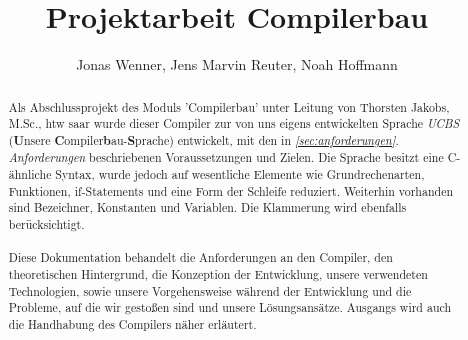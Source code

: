 \documentclass[12pt, a4paper, oneside, ngerman]{article}
\title{Projektarbeit Compilerbau}
\begin{document}
\author{Jonas Wenner, Jens Marvin Reuter, Noah Hoffmann}

\maketitle
\thispagestyle{empty}
\pagebreak
\tableofcontents
\newpage


\begin{abstract}

\noindent
Als Abschlussprojekt des Moduls 'Compilerbau' unter Leitung von Thorsten Jakobs, M.Sc., htw saar wurde dieser Compiler zur von uns eigens entwickelten Sprache \textit{UCBS} (\textbf{U}nsere \textbf{C}ompiler\textbf{b}au-\textbf{S}prache) entwickelt, mit den in \textit{\ref{sec:anforderungen}. Anforderungen} beschriebenen Voraussetzungen und Zielen. Die Sprache besitzt eine C-ähnliche Syntax, wurde jedoch auf wesentliche Elemente wie Grundrechenarten, Funktionen, if-Statements und eine Form der Schleife reduziert. Weiterhin vorhanden sind Bezeichner, Konstanten und Variablen. Die Klammerung wird ebenfalls berücksichtigt.
\\\\
Diese Dokumentation behandelt die Anforderungen an den Compiler, den theoretischen Hintergrund, die Konzeption der Entwicklung, unsere verwendeten Technologien, sowie unsere Vorgehensweise während der Entwicklung und die Probleme, auf die wir gestoßen sind und unsere Lösungsansätze. Ausgangs wird auch die Handhabung des Compilers näher erläutert.

\end{abstract}

\newpage

\pagebreak

\pagebreak

\pagebreak

\pagebreak

\pagebreak

\pagebreak

\pagebreak
\end{document}
